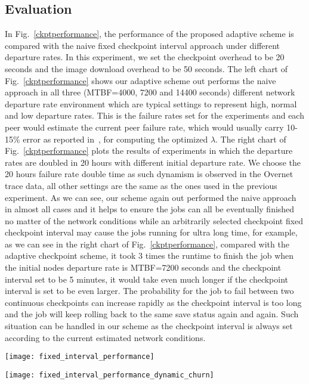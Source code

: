 \documentclass[times, 12pt, onecolumn]{article}
\newcommand{\reffig}[1]{Fig.~\ref{#1}}
\begin{document}
\subsection{Evaluation}
In \reffig{ckptperformance}, the performance of the proposed adaptive scheme is compared with the naive fixed
checkpoint interval approach under different departure rates. In this experiment, we set the checkpoint overhead 
to be 20 seconds and the image download overhead to be 50 seconds. The left chart of \reffig{ckptperformance} shows 
our adaptive scheme out performs the naive approach in all three (MTBF=4000, 7200 and 14400 seconds) different 
network departure rate environment which are typical settings to represent high, normal and low departure rates.
This is the failure rates set for the experiments and each peer would estimate the current peer failure rate, which 
would usually carry 10-15\% error as reported in~\cite{estimation}, for computing the optimized $\lambda$. 
The right chart of \reffig{ckptperformance} plots the results of experiments in which the departure rates are 
doubled in 20 hours with different initial departure rate. We choose the 20 hours failure rate double time as such
dynamism is observed in the Overnet trace data, all other settings are the same as the ones used in the previous experiment. 
As we can see, our scheme again out performed the naive approach in almost all cases and it helps to ensure
the jobs can all be eventually finished no matter of the network conditions while an arbitrarily selected checkpoint 
fixed checkpoint interval may cause the jobs running for ultra long time, for example, as we can see in the right 
chart of \reffig{ckptperformance}, compared with the adaptive checkpoint scheme, it took 3 times the runtime to finish 
the job when the initial nodes departure rate is MTBF=7200 seconds and the checkpoint interval set to be 5 minutes, it would 
take even much longer if the checkpoint interval is set to be even larger. The probability for the job to fail between 
two continuous checkpoints can increase rapidly as the checkpoint interval is too long and the job will keep rolling 
back to the same save status again and again. Such situation can be handled in our scheme as the checkpoint 
interval is always set according to the current estimated network conditions.    
    
\begin{figure*}
\begin{minipage}[b]{0.46\linewidth}
\centering
\texttt{[image: fixed\_interval\_performance]}
\end{minipage}
\begin{minipage}[b]{0.33\linewidth}
\centering
\texttt{[image: fixed\_interval\_performance\_dynamic\_churn]}
\end{minipage}
\caption{Performance Comparison Between the Adaptive Checkpoint and Fixed Intervals Approach.}
\label{ckptperformance}
\end{figure*}
\end{document}
